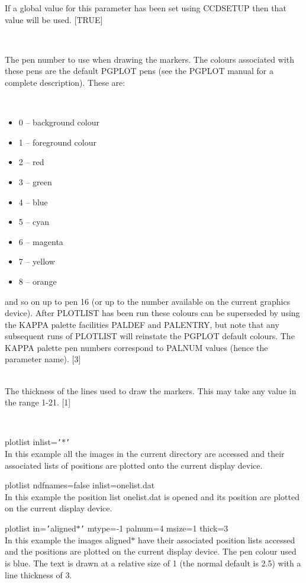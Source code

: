 \documentclass[twoside,11pt]{article}
\newcommand{\htmlref}[2]{#1}
\newcommand{\xref}[3]{#1}
\renewcommand{\_}{\texttt{\symbol{95}}}
\newcommand{\qs}[1]{{\tt '}#1{\tt '}}
\newcommand{\routine}[1]{{\sc #1}}
\newcommand{\xroutine}[1]{\htmlref{{\sc #1}}{#1}}
\newcommand{\sstexamples}[1]{
   \item[Examples:] \mbox{} \\
   \vspace{-3.5ex}
   \begin{description}
      #1
   \end{description}
}
\newcommand{\sstsubsection}[1]{ \item[{#1}] \mbox{} \\}
\newcommand{\sstexamplesubsection}[2]{\sloppy \item{\ssttt #1} \mbox{} \\ #2 }
\newcommand{\sstnotes}[1]{\item[Notes:] \mbox{} \\[1.3ex] #1}
\newcommand{\sstitemlist}[1]{
  \mbox{} \\
  \vspace{-3.5ex}
  \begin{itemize}
     #1
  \end{itemize}
}
\newcommand{\sstitem}{\item}
\newcommand{\sstexamples}[1]{
      \item[Examples:] \\
      \begin{description}
         #1
      \end{description}
      \\
   }
\newcommand{\sstsubsection}[1]{\item[{#1}]}
\newcommand{\sstexamplesubsection}[2]{\item[{\ssttt #1}] #2}
\newcommand{\sstnotes}[1]{\item[Notes:] #1 }
\newcommand{\sstitemlist}[1]{
      \begin{itemize}
         #1
      \end{itemize}
      \\
   }
\newcommand{\sstitem}{\item}
\begin{document}
{{{         If a global value for this parameter has been set using
         \xroutine{CCDSETUP} then that value will be used.
         [TRUE]
      }
      \sstsubsection{
         PALNUM = \_INTEGER (Read)
      } {
         The pen number to use when drawing the markers.  The colours
         associated with these pens are the default PGPLOT pens (see
         the PGPLOT manual for a complete description). These are:
         \sstitemlist{

            \sstitem
               0 -- background colour

            \sstitem
               1 -- foreground colour

            \sstitem
               2 -- red

            \sstitem
               3 -- green

            \sstitem
               4 -- blue

            \sstitem
               5 -- cyan

            \sstitem
               6 -- magenta

            \sstitem
               7 -- yellow

            \sstitem
               8 -- orange

         }
         and so on up to pen 16 (or up to the number available on the
         current graphics device). After \routine{PLOTLIST} has been run these
         colours can be superseded by using the KAPPA palette
         facilities \xref{PALDEF}{sun95}{PALDEF} and
         \xref{PALENTRY}{sun95}{PALENTRY}, but note that any subsequent
         runs of \routine{PLOTLIST} will reinstate the \xref{PGPLOT}{sun15}{}
         default colours.
         The KAPPA palette pen numbers correspond to PALNUM values
         (hence the parameter name).
         [3]
      }
      \sstsubsection{
         THICK = \_INTEGER (Read)
      } {
         The thickness of the lines used to draw the markers. This may
         take any value in the range 1-21.
         [1]
      }
   }
   \sstexamples{
      \sstexamplesubsection{
         plotlist inlist=\qs{$*$}
      } {
         In this example all the images in the current directory are
         accessed and their associated lists of positions are plotted
         onto the current display device.
      }
      \sstexamplesubsection{
         plotlist ndfnames=false inlist=one\_list.dat
      } {
         In this example the position list one\_list.dat is opened and
         its position are plotted on the current display device.
      }
      \sstexamplesubsection{
         plotlist in=\qs{aligned\_$*$} mtype=-1 palnum=4 msize=1 thick=3
      } {
         In this example the images aligned\_$*$ have their associated
         position lists accessed and the positions are plotted on the
         current display device. The pen colour used is blue. The
         text is drawn at a relative size of 1 (the normal default  is
         2.5) with a line thickness of 3.
      }
   }
   \sstnotes{
      \sstitemlist{

}}}
\end{document}
